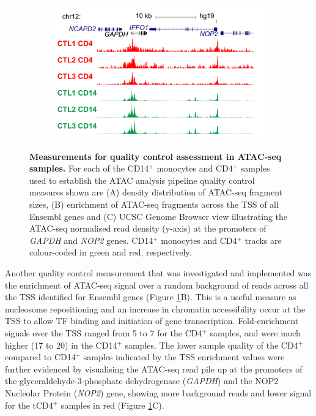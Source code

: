 \begin{figure}[htbp]
\begin{subfigure}[b]{0.6\textwidth}
\centering
\includegraphics[width=\textwidth]{./Results1/pdfs/ATAC_Core_CD4_CD14_fresh_GAPDH}
\caption{\textbf{}} %
\end{subfigure}
\caption[Measurements for quality control assessment in ATAC-seq samples]{\textbf{Measurements for quality control assessment in ATAC-seq samples.} For each of the CD14$^+$ monocytes and CD4$^+$ samples used to establish the ATAC analysis pipeline quality control measures shown are (A) density distribution of ATAC-seq fragment sizes, (B) enrichment of ATAC-seq fragments across the TSS of all Ensembl genes and (C) UCSC Genome Browser view illustrating the ATAC-seq normalised read density (y-axis) at the promoters of \textit{GAPDH} and \textit{NOP2} genes. CD14$^+$ monocytes and CD4$^+$ tracks are colour-coded in green and red, respectively.}
\label{figure:QC_ATAC}
\end{figure} 

Another quality control measurement that was investigated and implemented was the enrichment of ATAC-seq signal over a random background of reads across all the TSS identified for Ensembl genes (Figure \ref{figure:QC_ATAC}B). This is a useful measure as nucleosome repositioning and an increase in chromatin accessibility occur at the TSS to allow TF binding and initiation of gene transcription. Fold-enrichment signals over the TSS ranged from 5 to 7 for the CD4$^+$ samples, and were much higher (17 to 20) in the CD14$^+$ samples. The lower sample quality of the CD4$^+$ compared to CD14$^+$ samples indicated by the TSS enrichment values were further evidenced by visualising the ATAC-seq read pile up at the promoters of the glyceraldehyde-3-phosphate dehydrogenase (\textit{GAPDH}) and the NOP2 Nucleolar Protein (\textit{NOP2}) gene, showing more background reads and lower signal for the tCD4$^+$ samples in red (Figure \ref{figure:QC_ATAC}C).
	

